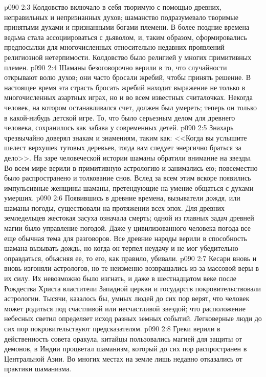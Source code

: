 \vs p090 2:3 Колдовство включало в себя  творимую с помощью древних, неправильных и непризнанных духов; шаманство подразумевало  творимые принятыми духами и признанными богами племени. В более поздние времена ведьма стала ассоциироваться с дьяволом, и, таким образом, сформировались предпосылки для многочисленных относительно недавних проявлений религиозной нетерпимости. Колдовство было религией у многих примитивных племен.
\vs p090 2:4 Шаманы безоговорочно верили в то, что случайности открывают волю духов; они часто бросали жребий, чтобы принять решение. В настоящее время эта страсть бросать жребий находит выражение не только в многочисленных азартных играх, но и во всем известных считалочках. Некогда человек, на котором останавливался счет, должен был умереть; теперь он только  в какой\hyp{}нибудь детской игре. То, что было серьезным делом для древнего человека, сохранилось как забава у современных детей.
\vs p090 2:5 Знахарь чрезвычайно доверял знакам и знамениям, таким как: <<Когда вы услышите шелест верхушек тутовых деревьев, тогда вам следует энергично браться за дело>>. На заре человеческой истории шаманы обратили внимание на звезды. Во всем мире верили в примитивную астрологию и занимались ею; повсеместно было распространено и толкование снов. Вслед за всем этим вскоре появились импульсивные женщины\hyp{}шаманы, претендующие на умение общаться с духами умерших.
\vs p090 2:6 Появившись в древние времена, вызыватели дождя, или шаманы погоды, существовали на протяжении всех эпох. Для древних земледельцев жестокая засуха означала смерть; одной из главных задач древней магии было управление погодой. Даже у цивилизованного человека погода все еще обычная тема для разговоров. Все древние народы верили в способность шамана вызывать дождь, но когда он терпел неудачу и не мог убедительно оправдаться, объясняя ее, то его, как правило, убивали.
\vs p090 2:7 Кесари вновь и вновь изгоняли астрологов, но те неизменно возвращались из\hyp{}за массовой веры в их силу. Их невозможно было изгнать, и даже в шестнадцатом веке после Рождества Христа властители Западной церкви и государств покровительствовали астрологии. Тысячи, казалось бы, умных людей до сих пор верят, что человек может родиться под счастливой или несчастливой звездой; что расположение небесных светил определяет исход разных земных событий. Легковерные люди до сих пор покровительствуют предсказателям.
\vs p090 2:8 Греки верили в действенность совета оракула, китайцы пользовались магией для защиты от демонов, в Индии процветал шаманизм, который до сих пор распространен в Центральной Азии. Во многих местах на земле лишь недавно отказались от практики шаманизма.

